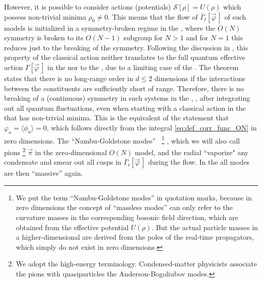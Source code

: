 However, it is possible to consider actions (potentials) $\mathcal{S} [ \rho ] = U ( \rho )$ which possess non-trivial minima $\rho_0 \neq 0$.
This means that the \frg{} flow of $\bar{\Gamma}_t [ \vec{\varphi} \, ]$ of such models is initialized in a symmetry-broken regime in the \uv{}, where the $O(N)$ symmetry is broken to its $O ( N - 1 )$ subgroup for $N>1$ and for $N=1$ this reduces just to the breaking of the \ZII{} symmetry.
Following the discussion in \MWApp{}, this property of the classical action neither translates to the full quantum effective action $\Gamma [ \vec{\varphi} \, ]$ in the \ir{} nor to the \nptFunctions{}, due to a limiting case of the \cmwhTheoremWithRefs{}.
The theorem states that there is no long-range order in $d \leq 2$ dimensions if the interactions between the constituents are sufficiently short of range.
Therefore, there is no breaking of a (continuous) symmetry in such systems in the \ir{}, \ie{}, after integrating out all quantum fluctuations, even when starting with a classical action in the \uv{} that has non-trivial minima.
This is the equivalent of the statement that $\varphi_a = \langle \phi_a \rangle = 0$, which follows directly from the integral \eqref{eq:def_corr_func_ON} in zero dimensions.
The ``Nambu-Goldstone modes''~\cite{Nambu:1960tm,Goldstone:1961eq,Goldstone:1962es}%
\footnote{%
	We put the term ``Nambu-Goldstone modes'' in quotation marks, because in zero dimensions the concept of ``massless modes'' can only refer to the curvature masses in the corresponding bosonic field direction, which are obtained from the effective potential $U(\rho)$.
	But the actual particle masses in a higher-dimensional \qft{} are derived from the poles of the real-time propagators, which simply do not exist in zero dimensions.
}%
, which we will also call pions%
\footnote{%
	We adopt the high-energy terminology. Condensed-matter physicists  associate the pions with quasiparticles \dash{} the Anderson-Bogoliubov modes.%
}	$\vec{\pi}$ in the zero-dimensional $O(N)$ model, and the radial \sigmaMode{} ``vaporize" any condensate and smear out all cusps in $\bar{\Gamma}_t [ \vec{\varphi} \, ]$ during the \frg{} flow.
In the \ir{} all modes are then ``massive'' again.

